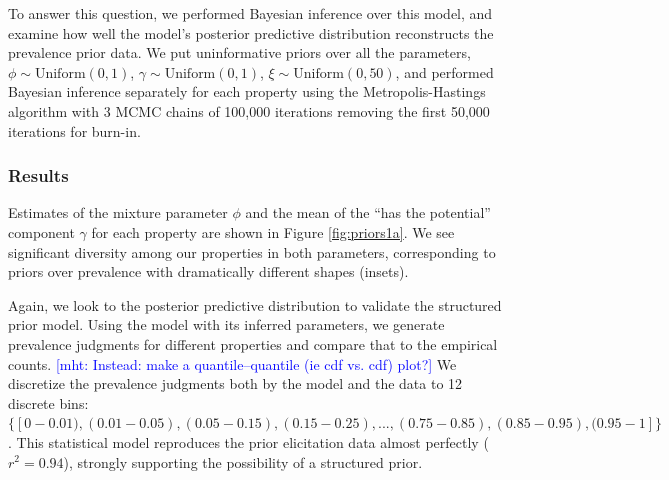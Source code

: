 \documentclass[12pt,letterpaper]{article}
\newcommand{\ndg}[1]{\textcolor{Green}{[ndg: #1]}}
\newcommand{\mht}[1]{\textcolor{Blue}{[mht: #1]}}
\begin{document}
To answer this question, we performed Bayesian inference over this model, and examine how well the model's posterior predictive distribution reconstructs the prevalence prior data.
We put uninformative priors over all the parameters, $\phi \sim \text{Uniform}(0,1)$, 
$\gamma \sim \text{Uniform}(0,1)$, $\xi \sim \text{Uniform}(0, 50)$, 
and performed Bayesian inference separately for each property using the Metropolis-Hastings algorithm 
with 3 MCMC chains of 100,000 iterations removing the first 50,000 iterations for burn-in.

\subsubsection*{Results}


Estimates of the mixture parameter $\phi$ and the mean of the ``has the potential'' component $\gamma$ for each property are shown in Figure \ref{fig:priors1a}.
We see significant diversity among our properties in both parameters, corresponding to priors over prevalence with dramatically different shapes (insets). 

Again, we look to the posterior predictive distribution to validate the structured prior model.
Using the model with its inferred parameters, we generate prevalence judgments for different properties and compare that to the empirical counts. 
\mht{Instead: make a quantile--quantile (ie cdf vs. cdf) plot?}
We discretize the prevalence judgments both by the model and the data to 12 discrete bins: $\{[0-0.01), (0.01-0.05), (0.05-0.15), (0.15-0.25),  ..., (0.75-0.85), (0.85-0.95), (0.95-1]\}$.
This statistical model reproduces the prior elicitation data almost perfectly ($r^2 = 0.94$), strongly supporting the possibility of a structured prior. 
\end{document}
